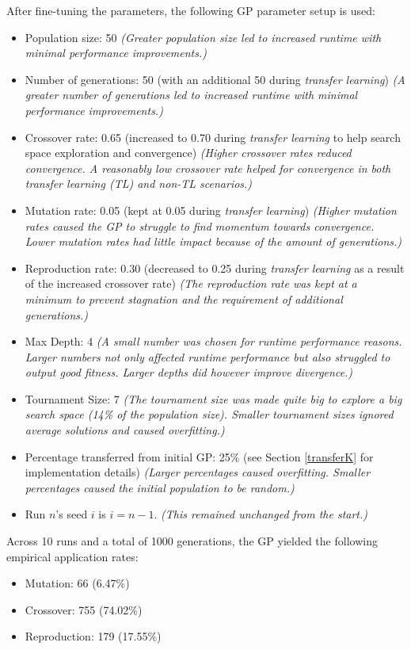 \documentclass{article}
\begin{document}
After fine-tuning the parameters, the following GP parameter setup is used:
\begin{itemize}
  \item Population size: 50 \emph{(Greater population size led to increased runtime with minimal performance improvements.)}
  \item Number of generations: 50 (with an additional 50 during \emph{transfer learning}) \emph{(A greater number of generations led to increased runtime with minimal performance improvements.)}
  \item Crossover rate: 0.65 (increased to 0.70 during \emph{transfer learning} to help search space exploration and convergence) \emph{(Higher crossover rates reduced convergence. A reasonably low crossover rate helped for convergence in both transfer learning (TL) and non-TL scenarios.)}
  \item Mutation rate: 0.05 (kept at 0.05 during \emph{transfer learning}) \emph{(Higher mutation rates caused the GP to struggle to find momentum towards convergence. Lower mutation rates had little impact because of the amount of generations.)}
  \item Reproduction rate: 0.30 (decreased to 0.25 during \emph{transfer learning} as a result of the increased crossover rate) \emph{(The reproduction rate was kept at a minimum to prevent stagnation and the requirement of additional generations.)}
  \item Max Depth: 4 \emph{(A small number was chosen for runtime performance reasons. Larger numbers not only affected runtime performance but also struggled to output good fitness. Larger depths did however improve divergence.)} 
  \item Tournament Size: 7 \emph{(The tournament size was made quite big to explore a big search space (14\% of the population size). Smaller tournament sizes ignored average solutions and caused overfitting.)}
  \item Percentage transferred from initial GP: 25\% (see Section \ref{transferK} for implementation details) \emph{(Larger percentages caused overfitting. Smaller percentages caused the initial population to be random.)}
  \item Run \(n\)'s seed \(i\) is \(i = n-1\). \emph{(This remained unchanged from the start.)}
\end{itemize}

Across 10 runs and a total of 1000 generations, the GP yielded the following empirical application rates:
\begin{itemize}
  \item Mutation: 66 (6.47\%)
  \item Crossover: 755 (74.02\%)
  \item Reproduction: 179 (17.55\%)
\end{itemize}
\end{document}
